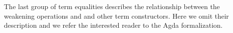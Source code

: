 \begin{AgdaAlign}
The last group of term equalities describes the relationship between the
weakening operations  and  and other term constructors. Here we omit their description and we refer the
interested reader to the Agda formalization.
\end{AgdaAlign}
